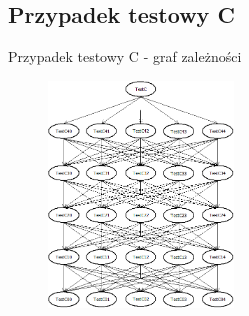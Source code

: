 \documentclass{beamer}
\begin{document}
\subsection*{Przypadek testowy C}

\begin{frame}{Przypadek testowy C - graf zależności}
\begin{figure}[H]
	\begin{center}
  		\includegraphics[height=6cm]{TestC.png}
	\end{center}
\end{figure}
\end{frame}
\end{document}
